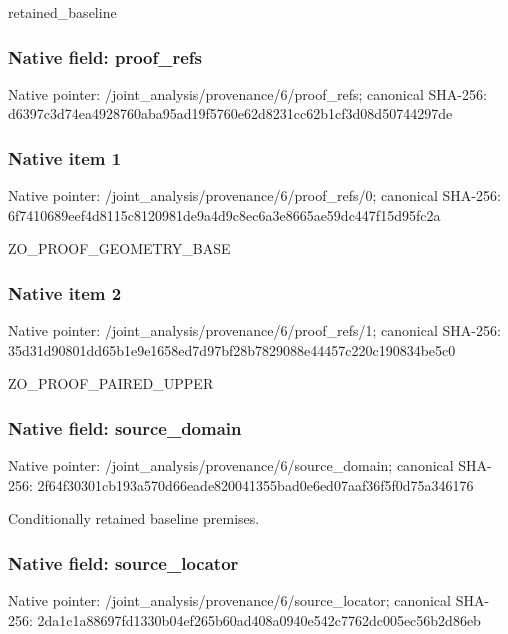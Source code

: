 \documentclass[10pt,a4paper]{article}
\begin{document}
retained\_baseline


\subsubsection{Native field: proof\_refs}


Native pointer: /joint\_analysis/provenance/6/proof\_refs; canonical SHA-256: d6397c3d74ea4928760aba95\allowbreak{}ad19f5760e62d8231cc62b1c\allowbreak{}f3d08d50744297de



\subsubsection{Native item 1}


Native pointer: /joint\_analysis/provenan\allowbreak{}ce/6/proof\_refs/0; canonical SHA-256: 6f7410689eef4d8115c81209\allowbreak{}81de9a4d9c8ec6a3e8665ae5\allowbreak{}9dc447f15d95fc2a


ZO\_PROOF\_GEOMETRY\_BASE


\subsubsection{Native item 2}


Native pointer: /joint\_analysis/provenan\allowbreak{}ce/6/proof\_refs/1; canonical SHA-256: 35d31d90801dd65b1e9e1658\allowbreak{}ed7d97bf28b7829088e44457\allowbreak{}c220c190834be5c0


ZO\_PROOF\_PAIRED\_UPPER


\subsubsection{Native field: source\_domain}


Native pointer: /joint\_analysis/provenan\allowbreak{}ce/6/source\_domain; canonical SHA-256: 2f64f30301cb193a570d66ea\allowbreak{}de820041355bad0e6ed07aaf\allowbreak{}36f5f0d75a346176


Conditionally retained baseline premises.


\subsubsection{Native field: source\_locator}


Native pointer: /joint\_analysis/provenan\allowbreak{}ce/6/source\_locator; canonical SHA-256: 2da1c1a88697fd1330b04ef2\allowbreak{}65b60ad408a0940e542c7762\allowbreak{}dc005ec56b2d86eb
\end{document}
